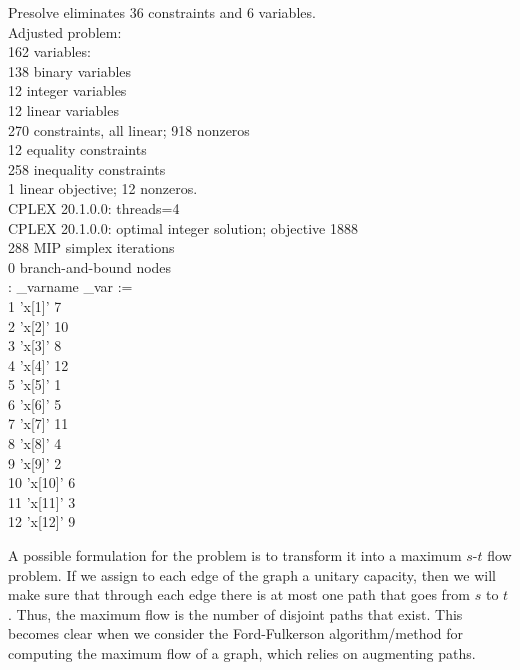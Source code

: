 \documentclass[a4paper]{report}
\newenvironment{alltt}{\ttfamily}{\par}
\begin{document}
\begin{alltt}
Presolve eliminates 36 constraints and 6 variables. \\
Adjusted problem: \\
162 variables: \\
\-\hspace{2cm}138 binary variables \\
\-\hspace{2cm}12 integer variables \\
\-\hspace{2cm}12 linear variables \\
270 constraints, all linear; 918 nonzeros \\
\-\hspace{2cm}12 equality constraints \\
\-\hspace{2cm}258 inequality constraints \\
1 linear objective; 12 nonzeros. \\

CPLEX 20.1.0.0: threads=4 \\
CPLEX 20.1.0.0: optimal integer solution; objective 1888 \\
288 MIP simplex iterations \\
0 branch-and-bound nodes \\
:      \_varname  \_var    := \\
1     'x[1]'        7 \\
2     'x[2]'       10 \\
3     'x[3]'        8 \\
4     'x[4]'       12 \\
5     'x[5]'        1 \\
6     'x[6]'        5 \\
7     'x[7]'       11 \\
8     'x[8]'        4 \\
9     'x[9]'        2 \\
10    'x[10]'       6 \\
11    'x[11]'       3 \\
12    'x[12]'       9 \\
\end{alltt}



A possible formulation for the problem is to transform it into a maximum $s$-$t$ flow problem. If we assign to each edge of the graph a unitary capacity, then we will make sure that through each edge there is at most one path that goes from $s$ to $t$. Thus, the maximum flow is the number of disjoint paths that exist. This becomes clear when we consider the Ford-Fulkerson algorithm/method for computing the maximum flow of a graph, which relies on augmenting paths.
\end{document}
